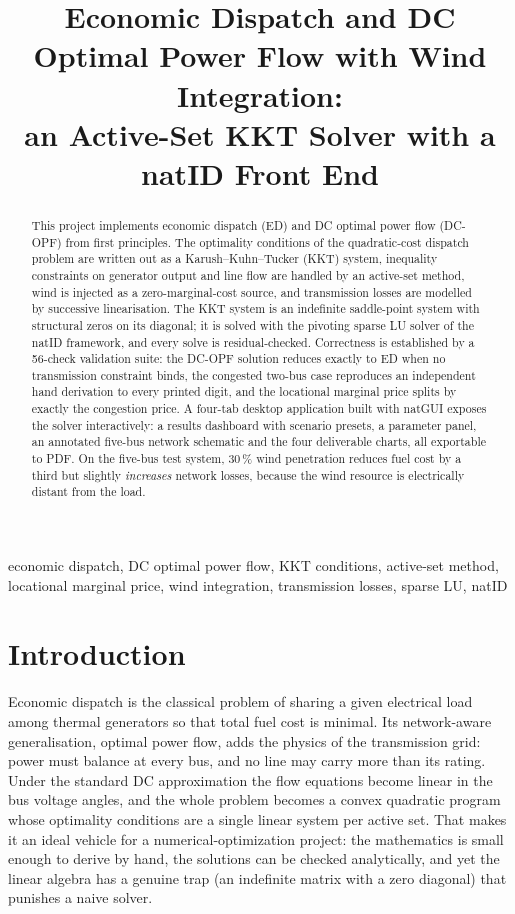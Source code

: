 \documentclass[conference]{IEEEtran}
\title{Economic Dispatch and DC Optimal Power Flow with Wind Integration:\\
       an Active-Set KKT Solver with a natID Front End}
\author{\IEEEauthorblockN{Faris Muratovi\'c}
\IEEEauthorblockA{Project Report (Numerical Optimization, Topic~11)\\
Student ID: 19958\\
Faculty of Electrical Engineering, University of Sarajevo\\
Instructor: Prof.\ Dr.\ Izudin D\v{z}afi\'c}}
\begin{document}
\maketitle

\begin{abstract}
This project implements economic dispatch (ED) and DC optimal power flow (DC-OPF) from first principles. The optimality conditions of the quadratic-cost dispatch problem are written out as a Karush--Kuhn--Tucker (KKT) system, inequality constraints on generator output and line flow are handled by an active-set method, wind is injected as a zero-marginal-cost source, and transmission losses are modelled by successive linearisation. The KKT system is an indefinite saddle-point system with structural zeros on its diagonal; it is solved with the pivoting sparse LU solver of the natID framework, and every solve is residual-checked. Correctness is established by a 56-check validation suite: the DC-OPF solution reduces exactly to ED when no transmission constraint binds, the congested two-bus case reproduces an independent hand derivation to every printed digit, and the locational marginal price splits by exactly the congestion price. A four-tab desktop application built with natGUI exposes the solver interactively: a results dashboard with scenario presets, a parameter panel, an annotated five-bus network schematic and the four deliverable charts, all exportable to PDF. On the five-bus test system, 30\,\% wind penetration reduces fuel cost by a third but slightly \emph{increases} network losses, because the wind resource is electrically distant from the load.
\end{abstract}

\begin{IEEEkeywords}
economic dispatch, DC optimal power flow, KKT conditions, active-set method, locational marginal price, wind integration, transmission losses, sparse LU, natID
\end{IEEEkeywords}

\section{Introduction}
Economic dispatch is the classical problem of sharing a given electrical load among thermal generators so that total fuel cost is minimal. Its network-aware generalisation, optimal power flow, adds the physics of the transmission grid: power must balance at every bus, and no line may carry more than its rating. Under the standard DC approximation the flow equations become linear in the bus voltage angles, and the whole problem becomes a convex quadratic program whose optimality conditions are a single linear system per active set. That makes it an ideal vehicle for a numerical-optimization project: the mathematics is small enough to derive by hand, the solutions can be checked analytically, and yet the linear algebra has a genuine trap (an indefinite matrix with a zero diagonal) that punishes a naive solver.
\end{document}
